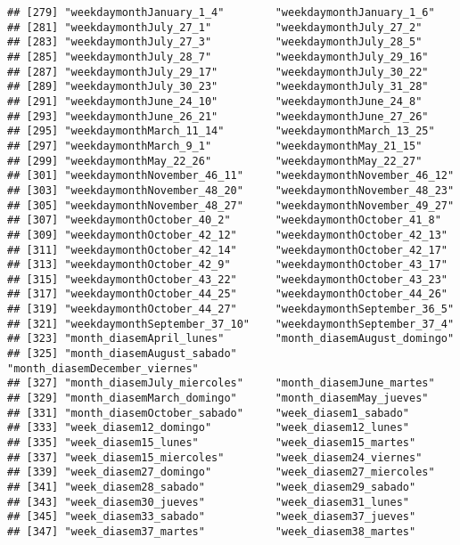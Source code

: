 \documentclass[
]{book}
\begin{document}
\begin{verbatim}
## [279] "weekdaymonthJanuary_1_4"        "weekdaymonthJanuary_1_6"       
## [281] "weekdaymonthJuly_27_1"          "weekdaymonthJuly_27_2"         
## [283] "weekdaymonthJuly_27_3"          "weekdaymonthJuly_28_5"         
## [285] "weekdaymonthJuly_28_7"          "weekdaymonthJuly_29_16"        
## [287] "weekdaymonthJuly_29_17"         "weekdaymonthJuly_30_22"        
## [289] "weekdaymonthJuly_30_23"         "weekdaymonthJuly_31_28"        
## [291] "weekdaymonthJune_24_10"         "weekdaymonthJune_24_8"         
## [293] "weekdaymonthJune_26_21"         "weekdaymonthJune_27_26"        
## [295] "weekdaymonthMarch_11_14"        "weekdaymonthMarch_13_25"       
## [297] "weekdaymonthMarch_9_1"          "weekdaymonthMay_21_15"         
## [299] "weekdaymonthMay_22_26"          "weekdaymonthMay_22_27"         
## [301] "weekdaymonthNovember_46_11"     "weekdaymonthNovember_46_12"    
## [303] "weekdaymonthNovember_48_20"     "weekdaymonthNovember_48_23"    
## [305] "weekdaymonthNovember_48_27"     "weekdaymonthNovember_49_27"    
## [307] "weekdaymonthOctober_40_2"       "weekdaymonthOctober_41_8"      
## [309] "weekdaymonthOctober_42_12"      "weekdaymonthOctober_42_13"     
## [311] "weekdaymonthOctober_42_14"      "weekdaymonthOctober_42_17"     
## [313] "weekdaymonthOctober_42_9"       "weekdaymonthOctober_43_17"     
## [315] "weekdaymonthOctober_43_22"      "weekdaymonthOctober_43_23"     
## [317] "weekdaymonthOctober_44_25"      "weekdaymonthOctober_44_26"     
## [319] "weekdaymonthOctober_44_27"      "weekdaymonthSeptember_36_5"    
## [321] "weekdaymonthSeptember_37_10"    "weekdaymonthSeptember_37_4"    
## [323] "month_diasemApril_lunes"        "month_diasemAugust_domingo"    
## [325] "month_diasemAugust_sabado"      "month_diasemDecember_viernes"  
## [327] "month_diasemJuly_miercoles"     "month_diasemJune_martes"       
## [329] "month_diasemMarch_domingo"      "month_diasemMay_jueves"        
## [331] "month_diasemOctober_sabado"     "week_diasem1_sabado"           
## [333] "week_diasem12_domingo"          "week_diasem12_lunes"           
## [335] "week_diasem15_lunes"            "week_diasem15_martes"          
## [337] "week_diasem15_miercoles"        "week_diasem24_viernes"         
## [339] "week_diasem27_domingo"          "week_diasem27_miercoles"       
## [341] "week_diasem28_sabado"           "week_diasem29_sabado"          
## [343] "week_diasem30_jueves"           "week_diasem31_lunes"           
## [345] "week_diasem33_sabado"           "week_diasem37_jueves"          
## [347] "week_diasem37_martes"           "week_diasem38_martes"          

\end{verbatim}
\end{document}
